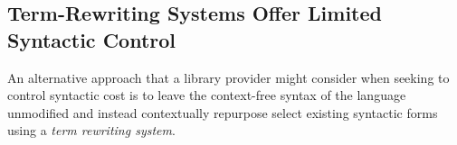\documentclass[acmlarge,review,anonymous]{acmart}\settopmatter{printfolios=true}
\newcommand{\li}[1]{\lstinline{#1}}
\begin{document}



\subsection{Term-Rewriting Systems Offer Limited Syntactic Control}
An alternative approach that a library provider might consider when seeking to control syntactic cost is to leave the context-free syntax of the language unmodified and instead contextually repurpose select existing syntactic forms using a \emph{term rewriting system}.
\end{document}
